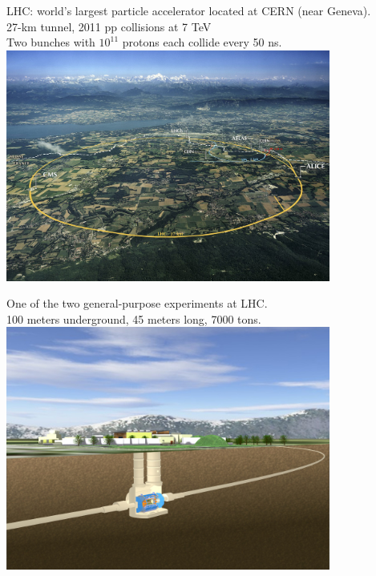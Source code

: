 {
\centering
LHC: world's largest particle accelerator located at CERN (near Geneva). \\
27-km tunnel, 2011 pp collisions at 7 TeV \\
Two bunches with $10^{11}$ protons each collide every 50 ns. \\
\includegraphics[width=0.8\textwidth]{dates/mtg/figures/atlas/LHC}

}

{
\centering
One of the two general-purpose experiments at LHC.\\
100 meters underground, 45 meters long, 7000 tons. \\
\includegraphics[width=0.8\textwidth]{dates/mtg/figures/atlas/ATLASUG}

}

